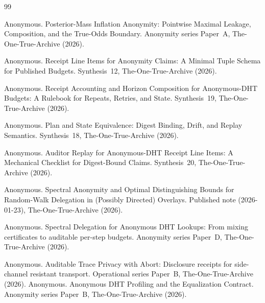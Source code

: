 \documentclass[11pt]{article}
\begin{document}
\begin{thebibliography}{99}\small

Anonymous.
\newblock Posterior-Mass Inflation Anonymity: Pointwise Maximal Leakage, Composition, and the True-Odds Boundary.
\newblock Anonymity series Paper~A, The-One-True-Archive (2026).

Anonymous.
\newblock Receipt Line Items for Anonymity Claims: A Minimal Tuple Schema for Published Budgets.
\newblock Synthesis~12, The-One-True-Archive (2026).

Anonymous.
\newblock Receipt Accounting and Horizon Composition for Anonymous-DHT Budgets: A Rulebook for Repeats, Retries, and State.
\newblock Synthesis~19, The-One-True-Archive (2026).

Anonymous.
\newblock Plan and State Equivalence: Digest Binding, Drift, and Replay Semantics.
\newblock Synthesis~18, The-One-True-Archive (2026).

Anonymous.
\newblock Auditor Replay for Anonymous-DHT Receipt Line Items: A Mechanical Checklist for Digest-Bound Claims.
\newblock Synthesis~20, The-One-True-Archive (2026).

Anonymous.
\newblock Spectral Anonymity and Optimal Distinguishing Bounds for Random-Walk Delegation in (Possibly Directed) Overlays.
\newblock Published note (2026-01-23), The-One-True-Archive (2026).

Anonymous.
\newblock Spectral Delegation for Anonymous DHT Lookups: From mixing certificates to auditable per-step budgets.
\newblock Anonymity series Paper~D, The-One-True-Archive (2026).

Anonymous.
\newblock Auditable Trace Privacy with Abort: Disclosure receipts for side-channel resistant transport.
\newblock Operational series Paper~B, The-One-True-Archive (2026).
Anonymous.
\newblock Anonymous DHT Profiling and the Equalization Contract.
\newblock Anonymity series Paper~B, The-One-True-Archive (2026).
\end{thebibliography}
\end{document}

